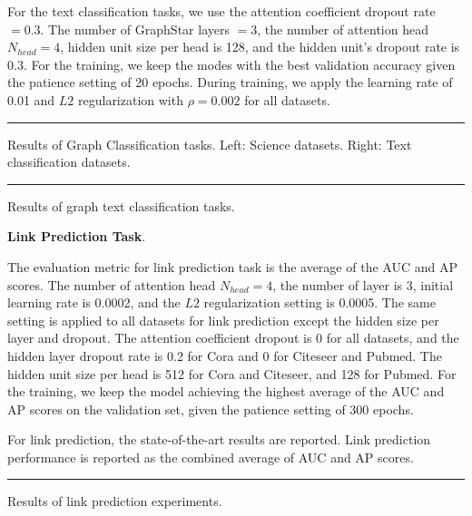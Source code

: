 \documentclass{article}
\begin{document}
For the text classification tasks, we use the attention coefficient dropout rate \(= 0.3\). The number of GraphStar layers \(=3\), the number of attention head \(N_{head}=4\), hidden unit size per head is 128, and the hidden unit's dropout rate is 0.3. For the training, we keep the modes with the best validation accuracy given the patience setting of 20 epochs. During training, we apply the learning rate of 0.01 and \(L2\) regularization with \(\rho = 0.002\) for all datasets. 

\begin{table}[!ht]
\centering
{}
\rule{\linewidth}{0cm}
\caption{\label{Table3:Graph Classification} Results of Graph Classification tasks. Left: Science datasets. Right: Text classification datasets.}
\end{table}
\begin{table}[!ht]
\centering
{}
\rule{\linewidth}{0cm}
\caption{\label{Table4:Graph Classification Text} Results of graph text classification tasks.}
\end{table}
\vspace*{-\baselineskip}

\textbf{Link Prediction Task}. 

The evaluation metric for link prediction task is the average of the AUC and AP scores. The number of attention head \(N_{head}=4\), the number of layer is 3, initial learning rate is 0.0002, and the \(L2\) regularization setting is 0.0005. The same setting is applied to all datasets for link prediction except the hidden size per layer and dropout. The attention coefficient dropout is 0 for all datasets, and the hidden layer dropout rate is 0.2 for Cora and 0 for Citeseer and Pubmed. The hidden unit size per head is 512 for Cora and Citeseer, and 128 for Pubmed. For the training, we keep the model achieving the highest average of the AUC and AP scores on the validation set, given the patience setting of 300 epochs. 

For link prediction, the \cite{kipf2016semi, DBLP:journals/corr/abs-1811-02798} state-of-the-art results are reported. Link prediction performance is reported as the combined average of AUC and AP scores.

\begin{table}[!ht]
\centering
{}
\rule{\linewidth}{0cm}
\caption{\label{Table5:Link Prediction} Results of link prediction experiments.}
\end{table}
\end{document}

